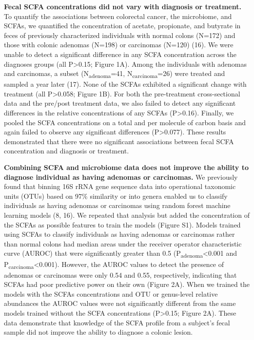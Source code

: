 \documentclass[11pt,]{article}
\begin{document}
\textbf{Fecal SCFA concentrations did not vary with diagnosis or
treatment.} To quantify the associations between colorectal cancer, the
microbiome, and SCFAs, we quantified the concentration of acetate,
propionate, and butyrate in feces of previously characterized
individuals with normal colons (N=172) and those with colonic adenomas
(N=198) or carcinomas (N=120) (16). We were unable to detect a
significant difference in any SCFA concentration across the diagnoses
groups (all P\textgreater{}0.15; Figure 1A). Among the individuals with
adenomas and carcinomas, a subset (N\textsubscript{adenoma}=41,
N\textsubscript{carcinoma}=26) were treated and sampled a year later
(17). None of the SCFAs exhibited a significant change with treatment
(all P\textgreater{}0.058; Figure 1B). For both the pre-treatment
cross-sectional data and the pre/post treatment data, we also failed to
detect any significant differences in the relative concentrations of any
SCFAs (P\textgreater{}0.16). Finally, we pooled the SCFA concentrations
on a total and per molecule of carbon basis and again failed to observe
any significant differences (P\textgreater{}0.077). These results
demonstrated that there were no significant associations between fecal
SCFA concentration and diagnosis or treatment.

\textbf{Combining SCFA and microbiome data does not improve the ability
to diagnose individual as having adenomas or carcinomas.} We previously
found that binning 16S rRNA gene sequence data into operational
taxonomic units (OTUs) based on 97\% similarity or into genera enabled
us to classify individuals as having adenomas or carcinomas using random
forest machine learning models (8, 16). We repeated that analysis but
added the concentration of the SCFAs as possible features to train the
models (Figure S1). Models trained using SCFAs to classify individuals
as having adenomas or carcinomas rather than normal colons had median
areas under the receiver operator characteristic curve (AUROC) that were
significantly greater than 0.5 (P\textsubscript{adenoma}\textless{}0.001
and P\textsubscript{carcinoma}\textless{}0.001). However, the AUROC
values to detect the presence of adenomas or carcinomas were only 0.54
and 0.55, respectively, indicating that SCFAs had poor predictive power
on their own (Figure 2A). When we trained the models with the SCFAs
concentrations and OTU or genus-level relative abundances the AUROC
values were not significantly different from the same models trained
without the SCFA concentrations (P\textgreater{}0.15; Figure 2A). These
data demonstrate that knowledge of the SCFA profile from a subject's
fecal sample did not improve the ability to diagnose a colonic lesion.
\end{document}

